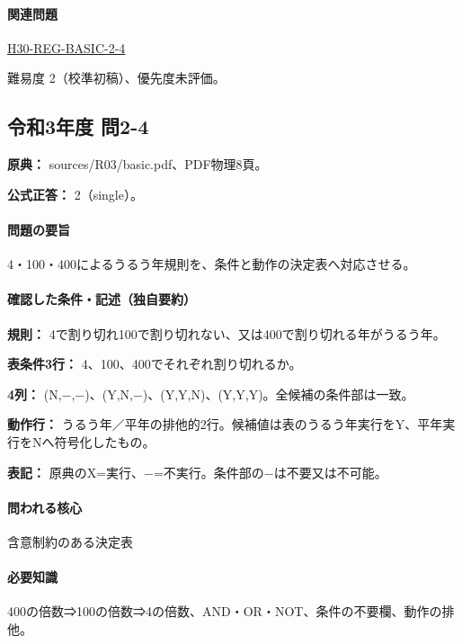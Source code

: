 \paragraph{関連問題} \hyperref[q:h30-reg-basic-2-4]{H30-REG-BASIC-2-4}

\par 難易度 2（校準初稿）、優先度未評価。

\subsection{令和3年度 問2-4}
\label{q:r03-reg-basic-2-4}

\noindent\textbf{原典：} sources/R03/basic.pdf、PDF物理8頁。

\textbf{公式正答：} 2（single）。

\paragraph{問題の要旨} 4・100・400によるうるう年規則を、条件と動作の決定表へ対応させる。

\paragraph{確認した条件・記述（独自要約）}\mbox{}\par

\noindent\textbf{規則：} 4で割り切れ100で割り切れない、又は400で割り切れる年がうるう年。\par

\noindent\textbf{表条件3行：} 4、100、400でそれぞれ割り切れるか。\par

\noindent\textbf{4列：} (N,−,−)、(Y,N,−)、(Y,Y,N)、(Y,Y,Y)。全候補の条件部は一致。\par

\noindent\textbf{動作行：} うるう年／平年の排他的2行。候補値は表のうるう年実行をY、平年実行をNへ符号化したもの。\par

\noindent\textbf{表記：} 原典のX=実行、−=不実行。条件部の−は不要又は不可能。\par

\paragraph{問われる核心} 含意制約のある決定表

\paragraph{必要知識} 400の倍数⇒100の倍数⇒4の倍数、AND・OR・NOT、条件の不要欄、動作の排他。

